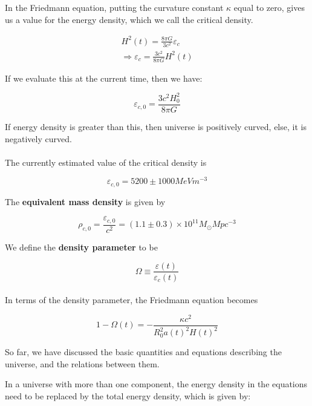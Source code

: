 \documentclass[a4,12pt,oneside]{report}
\begin{document}
	In the Friedmann equation, putting the curvature constant $\kappa$ equal to zero, gives us a value for the energy density, which we call the critical density.
	
	\begin{align}
	H^2(t)=\frac{8\pi G}{3c^2}\varepsilon_c \\
	\Rightarrow \varepsilon_c=\frac{3c^2}{8\pi G}H^2(t)
	\end{align}
	
	If we evaluate this at the current time, then we have:
	
	\begin{equation}
		\varepsilon_{c,0}=\frac{3c^2H_0^2}{8\pi G}
	\end{equation}
    
    If energy density is greater than this, then universe is positively curved, else, it is negatively curved. 
    \\ \\
    The currently estimated value of the critical density is 
    
    \begin{equation}
	    \varepsilon_{c,0} = 5200 \pm 1000 MeV m^{-3}
    \end{equation}
    
    The \textbf{equivalent mass density} is given by
    
    \begin{equation}
	    \rho_{c,0}= \frac{\varepsilon_{c,0}}{c^2} = (1.1 \pm 0.3) \times 10^{11} M_\odot Mpc^{-3}
    \end{equation}
    
    We define the \textbf{density parameter} to be 
    
   \begin{equation}
	   \Omega \equiv \frac{\varepsilon(t)}{\varepsilon_c(t)}
   \end{equation}
   \\
  
   In terms of the density parameter, the Friedmann equation becomes
   
   \begin{equation}
	   1-\Omega(t) = -\frac{\kappa c^2}{R_0^2 a(t)^2 H(t)^2}
   \end{equation}
   
   
   
   So far, we have discussed the basic quantities and equations describing the universe, and the relations between them.
   
   In a universe with more than one component, the energy density in the equations need to be replaced by the total energy density, which is given by:
   
\end{document}
